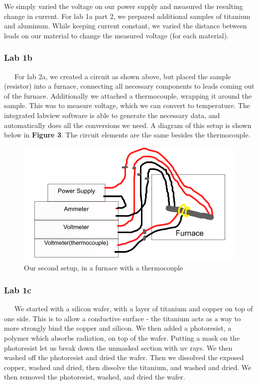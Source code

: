 \documentclass[11pt]{article}
\begin{document}
We simply varied the voltage on our power supply and measured the resulting change in current. For lab 1a part 2, we prepared additional samples of titanium and aluminum. While keeping current constant, we varied the distance between leads on our material to change the measured voltage (for each material).\\

\subsubsection*{Lab 1b}
\ \ \ For lab 2a, we created a circuit as shown above, but placed the sample (resistor) into a furnace, connecting all necessary components to leads coming out of the furnace. Additionally we attached a thermocouple, wrapping it around the sample. This was to measure voltage, which we can convert to temperature. The integrated labview software is able to generate the necessary data, and automatically does all the conversions we need. A diagram of this setup is shown below in \textbf{Figure 3}. The circuit elements are the same besides the thermocouple.

\begin{figure}[h]
	\centering
	\includegraphics[scale=0.5]{circuit2.png}
	\caption{Our second setup, in a furnace with a thermocouple}
\end{figure}

\subsubsection*{Lab 1c}
\ \ \ We started with a silicon wafer, with a layer of titanium and copper on top of one side. This is to allow a conductive surface - the titanium acts as a way to more strongly bind the copper and silicon. We then added a photoresist, a polymer which absorbs radiation, on top of the wafer. Putting a mask on the photoresist let us break down the unmasked section with uv rays. We then washed off the photoresist and dried the wafer. Then we dissolved the exposed copper, washed and dried, then dissolve the titanium, and washed and dried. We then removed the photoresist, washed, and dried the wafer.\\
\end{document}
